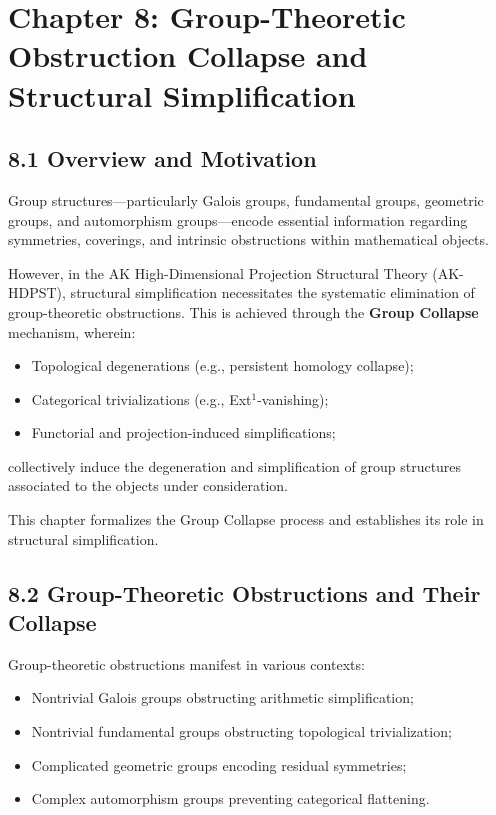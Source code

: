 \documentclass[11pt]{article}
\begin{document}
\section{Chapter 8: Group-Theoretic Obstruction Collapse and Structural Simplification}

\subsection*{8.1 Overview and Motivation}

Group structures—particularly Galois groups, fundamental groups, geometric groups, and automorphism groups—encode essential information regarding symmetries, coverings, and intrinsic obstructions within mathematical objects.

However, in the AK High-Dimensional Projection Structural Theory (AK-HDPST), structural simplification necessitates the systematic elimination of group-theoretic obstructions. This is achieved through the \textbf{Group Collapse} mechanism, wherein:

\begin{itemize}
    \item Topological degenerations (e.g., persistent homology collapse);
    \item Categorical trivializations (e.g., Ext$^1$-vanishing);
    \item Functorial and projection-induced simplifications;
\end{itemize}

collectively induce the degeneration and simplification of group structures associated to the objects under consideration.

This chapter formalizes the Group Collapse process and establishes its role in structural simplification.

\subsection*{8.2 Group-Theoretic Obstructions and Their Collapse}

Group-theoretic obstructions manifest in various contexts:

\begin{itemize}
    \item Nontrivial Galois groups obstructing arithmetic simplification;
    \item Nontrivial fundamental groups obstructing topological trivialization;
    \item Complicated geometric groups encoding residual symmetries;
    \item Complex automorphism groups preventing categorical flattening.
\end{itemize}
\end{document}
